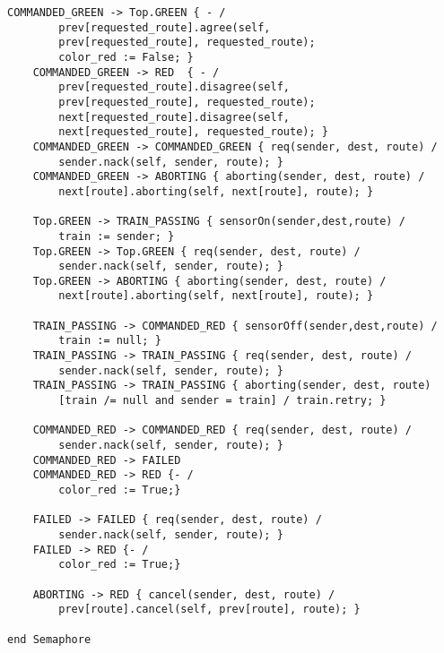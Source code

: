 \begin{lstlisting}[caption={modello della classe Semaphore}]
    COMMANDED_GREEN -> Top.GREEN { - / 
    	prev[requested_route].agree(self, 
    	prev[requested_route], requested_route); 
    	color_red := False; }
    COMMANDED_GREEN -> RED  { - / 
    	prev[requested_route].disagree(self, 
    	prev[requested_route], requested_route); 
    	next[requested_route].disagree(self, 
    	next[requested_route], requested_route); }
    COMMANDED_GREEN -> COMMANDED_GREEN { req(sender, dest, route) / 
    	sender.nack(self, sender, route); }
    COMMANDED_GREEN -> ABORTING { aborting(sender, dest, route) / 
    	next[route].aborting(self, next[route], route); }

    Top.GREEN -> TRAIN_PASSING { sensorOn(sender,dest,route) / 
    	train := sender; }
    Top.GREEN -> Top.GREEN { req(sender, dest, route) / 
    	sender.nack(self, sender, route); }
    Top.GREEN -> ABORTING { aborting(sender, dest, route) / 
    	next[route].aborting(self, next[route], route); }

    TRAIN_PASSING -> COMMANDED_RED { sensorOff(sender,dest,route) / 
    	train := null; }
    TRAIN_PASSING -> TRAIN_PASSING { req(sender, dest, route) / 
    	sender.nack(self, sender, route); }
    TRAIN_PASSING -> TRAIN_PASSING { aborting(sender, dest, route) 
    	[train /= null and sender = train] / train.retry; }
 
    COMMANDED_RED -> COMMANDED_RED { req(sender, dest, route) / 
    	sender.nack(self, sender, route); }
    COMMANDED_RED -> FAILED
    COMMANDED_RED -> RED {- / 
    	color_red := True;}
    
    FAILED -> FAILED { req(sender, dest, route) / 
    	sender.nack(self, sender, route); }
    FAILED -> RED {- / 
    	color_red := True;}

    ABORTING -> RED { cancel(sender, dest, route) / 
    	prev[route].cancel(self, prev[route], route); }

end Semaphore
\end{lstlisting}

